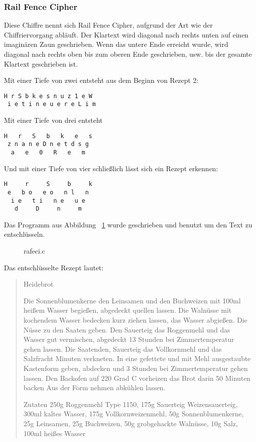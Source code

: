 \subsubsection*{Rail Fence Cipher}

Diese Chiffre nennt sich Rail Fence Cipher, aufgrund der Art wie der
Chiffriervorgang abläuft. Der Klartext wird diagonal nach rechts unten auf einen
imaginären Zaun geschrieben. Wenn das untere Ende erreicht wurde, wird diagonal
nach rechts oben bis zum oberen Ende geschrieben, usw. bis der gesamte Klartext
geschrieben ist.

Mit einer Tiefe von zwei entsteht aus dem Beginn von Rezept 2:

\begin{lstlisting}
H r S b k e s n u z 1 e W
 i e t i n e u e r e L i m
\end{lstlisting}

Mit einer Tiefe von drei entsteht

\begin{lstlisting}
H   r   S   b   k   e   s
 z n a n e D n e t d s g
  a   e   0   R   e   m
\end{lstlisting}
Und mit einer Tiefe von vier schließlich lässt sich ein Rezept erkennen:
\begin{lstlisting}
H     r     S     b     k
 e   b o   e o   n l   n
  i e   t i   n e   u e
   d     D     n     m
\end{lstlisting}

Das Programm aus Abbildung ~\ref{fig:rafeci} wurde geschrieben und benutzt um den Text zu
entschlüsseln.

\begin{figure}[p]

\caption{rafeci.c}
\label{fig:rafeci}
\end{figure}

Das entschlüsselte Rezept lautet:

\begin{quote}
Heidebrot

Die Sonnenblumenkerne den Leinsamen und den Buchweizen mit 100ml heißem Wasser begießen, abgedeckt quellen lassen.
Die Walnüsse mit kochendem Wasser bedecken kurz ziehen lassen, das Wasser abgießen. Die Nüsse zu den Saaten geben.
Den Sauerteig das Roggenmehl und das Wasser gut vermischen, abgedeckt 13 Stunden bei Zimmertemperatur gehen lassen.
Die Saatenden, Sauerteig das Vollkornmehl und das Salzfracht Minuten verkneten. In eine gefettete und mit Mehl
ausgestaubte Kastenform geben, abdecken und 3 Stunden bei Zimmertemperatur gehen lassen. Den Backofen auf 220 Grad C vorheizen
das Brot darin 50 Minuten backen Aus der Form nehmen abkühlen lassen.

Zutaten
250g Roggenmehl Type 1150, 175g Sauerteig Weizensauerteig, 300ml kaltes Wasser, 175g Vollkornweizenmehl, 50g
Sonnenblumenkerne, 25g Leinsamen, 25g Buchweizen, 50g grobgehackte Walnüsse, 10g Salz, 100ml heißes Wasser
\end{quote}
